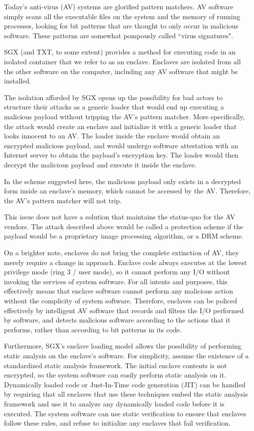 Today's anti-virus (AV) systems are glorified pattern matchers. AV software
simply scans all the executable files on the system and the memory of running
processes, looking for bit patterns that are thought to only occur in malicious
software. These patterns are somewhat pompously called ``virus signatures".

SGX (and TXT, to some extent) provides a method for executing code in an
isolated container that we refer to as an enclave. Enclaves are isolated from
all the other software on the computer, including any AV software that might be
installed.

The isolation afforded by SGX opens up the possibility for bad actors to
structure their attacks as a generic loader that would end up executing a
malicious payload without tripping the AV's pattern matcher.  More
specifically, the attack would create an enclave and initialize it with a
generic loader that looks innocent to an AV. The loader inside the enclave
would obtain an encrypted malicious payload, and would undergo software
attestation with an Internet server to obtain the payload's encryption key. The
loader would then decrypt the malicious payload and execute it inside the
enclave.

In the scheme suggested here, the malicious payload only exists in a decrypted
form inside an enclave's memory, which cannot be accessed by the AV. Therefore,
the AV's pattern matcher will not trip.

This issue does not have a solution that maintains the status-quo for the AV
vendors. The attack described above would be called a protection scheme if the
payload would be a proprietary image processing algorithm, or a DRM scheme.

On a brighter note, enclaves do not bring the complete extinction of AV, they
merely require a change in approach. Enclave code always executes at the lowest
privilege mode (ring 3 / user mode), so it cannot perform any I/O without
invoking the services of system software. For all intents and purposes, this
effectively means that enclave software cannot perform any malicious action
without the complicity of system software. Therefore, enclaves can be policed
effectively by intelligent AV software that records and filters the I/O
performed by software, and detects malicious software according to the actions
that it performs, rather than according to bit patterns in its code.

Furthermore, SGX's enclave loading model allows the possibility of performing
static analysis on the enclave's software. For simplicity, assume the existence
of a standardized static analysis framework.  The initial enclave contents is
not encrypted, so the system software can easily perform static analysis on it.
Dynamically loaded code or Just-In-Time code generation (JIT) can be handled by
requiring that all enclaves that use these techniques embed the static analysis
framework and use it to analyze any dynamically loaded code before it is
executed. The system software can use static verification to ensure that
enclaves follow these rules, and refuse to initialize any enclaves that fail
verification.

